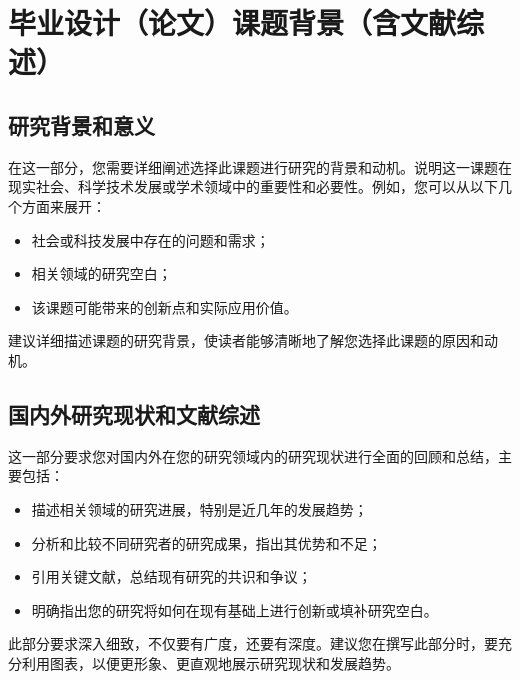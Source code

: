 \section{毕业设计（论文）课题背景（含文献综述）}

\subsection{研究背景和意义}

在这一部分，您需要详细阐述选择此课题进行研究的背景和动机。说明这一课题在现实社会、科学技术发展或学术领域中的重要性和必要性。例如，您可以从以下几个方面来展开：
\begin{itemize}
  \item 社会或科技发展中存在的问题和需求；
  \item 相关领域的研究空白；
  \item 该课题可能带来的创新点和实际应用价值。
\end{itemize}

建议详细描述课题的研究背景，使读者能够清晰地了解您选择此课题的原因和动机。

\subsection{国内外研究现状和文献综述}
这一部分要求您对国内外在您的研究领域内的研究现状进行全面的回顾和总结，主要包括：
\begin{itemize}
  \item 描述相关领域的研究进展，特别是近几年的发展趋势；
  \item 分析和比较不同研究者的研究成果，指出其优势和不足；
  \item 引用关键文献，总结现有研究的共识和争议；
  \item 明确指出您的研究将如何在现有基础上进行创新或填补研究空白。
\end{itemize}

此部分要求深入细致，不仅要有广度，还要有深度。建议您在撰写此部分时，要充分利用图表，以便更形象、更直观地展示研究现状和发展趋势。

